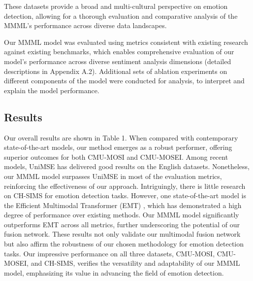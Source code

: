 \documentclass[11pt]{article}
\begin{document}
These datasets provide a broad and multi-cultural perspective on emotion detection, allowing for a thorough evaluation and comparative analysis of the MMML's performance across diverse data landscapes.

Our MMML model was evaluated using metrics consistent with existing research against existing benchmarks, which enables comprehensive evaluation of our model's performance across diverse sentiment analysis dimensions (detailed descriptions in Appendix A.2). Additional sets of ablation experiments on different components of the model were conducted for analysis, to interpret and explain the model performance. 



\subsection{Results}
Our overall results are shown in Table 1. When compared with contemporary state-of-the-art models, our method emerges as a robust performer, offering superior outcomes for both CMU-MOSI and CMU-MOSEI. Among recent models, UniMSE \cite{hu-etal-2022-unimse} has delivered good results on the English datasets. Nonetheless, our MMML model surpasses UniMSE in most of the evaluation metrics, reinforcing the effectiveness of our approach.  Intriguingly, there is little research on CH-SIMS for emotion detection tasks. However, one state-of-the-art model is the Efficient Multimodal Transformer (EMT) \cite{Sun_2023}, which has demonstrated a high degree of performance over existing methods. Our MMML model significantly outperforms EMT across all metrics, further underscoring the potential of our fusion network.
These results not only validate our multimodal fusion network but also affirm the robustness of our chosen methodology for emotion detection tasks. Our impressive performance on all three datasets, CMU-MOSI, CMU-MOSEI, and CH-SIMS, verifies the versatility and adaptability of our MMML model, emphasizing its value in advancing the field of emotion detection.
\end{document}
